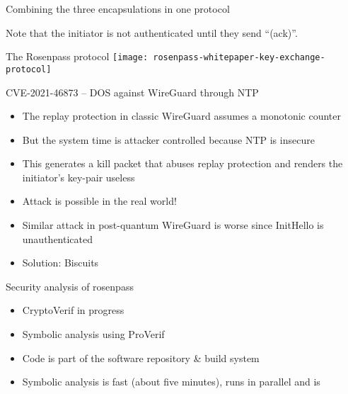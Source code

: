 \begin{frame}{Combining the three encapsulations in one protocol}


  Note that the initiator is not authenticated until they send \enquote{(ack)}.

\end{frame}

\begin{frame}{The Rosenpass protocol}
  \texttt{[image: rosenpass-whitepaper-key-exchange-protocol]}
\end{frame}

\begin{frame}{CVE-2021-46873 – DOS against WireGuard through NTP}
\begin{itemize}
  \item The replay protection in classic WireGuard assumes a monotonic counter
  \item But the system time is attacker controlled because NTP is insecure
  \item This generates a kill packet that abuses replay protection and renders the initiator's key-pair useless
  \item Attack is possible in the real world!
  \item Similar attack in post-quantum WireGuard is worse since InitHello is unauthenticated
  \item Solution: Biscuits
\end{itemize}
\end{frame}

\begin{frame}{Security analysis of rosenpass}
  \begin{itemize}
	\item CryptoVerif in progress
	\item Symbolic analysis using ProVerif
  \item Code is part of the software repository \& build system
  \item Symbolic analysis is fast (about five minutes), runs in parallel and is
  \end{itemize}
\end{frame}

